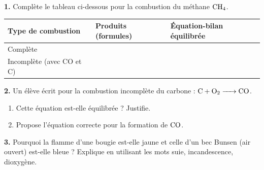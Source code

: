 \documentclass[11pt]{article}
\newcommand{\cle}[1]{{\popxbold\color{popdark}#1}}
\begin{document}
\begin{exercice}
\textbf{1.} Complète le tableau ci-dessous pour la combustion du méthane $\ce{CH4}$.
\begin{center}
\begin{tabularx}{\linewidth}{|>{\centering\arraybackslash}X|>{\centering\arraybackslash}X|>{\centering\arraybackslash}X|}
\hline
\textbf{Type de combustion} & \textbf{Produits (formules)} & \textbf{Équation-bilan équilibrée} \\ \hline
Complète & & \\ \hline
Incomplète (avec CO et C) & & \\ \hline
\end{tabularx}
\end{center}
\textbf{2.} Un élève écrit pour la combustion incomplète du carbone : $\ce{C + O2 -> CO}$. 
\begin{enumerate}
\item Cette équation est-elle équilibrée ? Justifie.
\item Propose l'équation correcte pour la formation de $\ce{CO}$.
\end{enumerate}
\textbf{3.} Pourquoi la flamme d'une bougie est-elle jaune et celle d'un bec Bunsen (air ouvert) est-elle bleue ? Explique en utilisant les mots \cle{suie}, \cle{incandescence}, \cle{dioxygène}.
\end{exercice}
\end{document}

